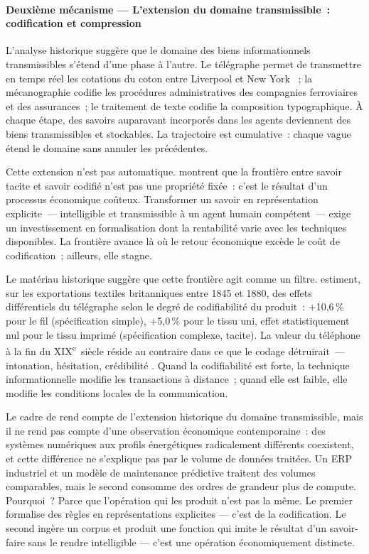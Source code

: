 \paragraph{Deuxième mécanisme --- L'extension du domaine transmissible~: codification et compression}

\markEVO
L'analyse historique suggère que le domaine des biens informationnels transmissibles s'étend d'une phase à l'autre. Le télégraphe permet de transmettre en temps réel les cotations du coton entre Liverpool et New York \parencite{steinwender_real_2018}~; la mécanographie codifie les procédures administratives des compagnies ferroviaires et des assurances~; le traitement de texte codifie la composition typographique. À chaque étape, des savoirs auparavant incorporés dans les agents deviennent des biens transmissibles et stockables. La trajectoire est cumulative~: chaque vague étend le domaine sans annuler les précédentes.

Cette extension n'est pas automatique. \textcite{cowan_explicit_2000} montrent que la frontière entre savoir tacite et savoir codifié n'est pas une propriété fixée~: c'est le résultat d'un processus économique coûteux. Transformer un savoir en représentation explicite~--- intelligible et transmissible à un agent humain compétent~--- exige un investissement en formalisation dont la rentabilité varie avec les techniques disponibles. La frontière avance là où le retour économique excède le coût de codification~; ailleurs, elle stagne.

Le matériau historique suggère que cette frontière agit comme un filtre. \textcite{juhasz_spinning_2018} estiment, sur les exportations textiles britanniques entre 1845 et 1880, des effets différentiels du télégraphe selon le degré de codifiabilité du produit~: $+$10,6\,\% pour le fil (spécification simple), $+$5,0\,\% pour le tissu uni, effet statistiquement nul pour le tissu imprimé (spécification complexe, tacite). La valeur du téléphone à la fin du XIX\textsuperscript{e}~siècle réside au contraire dans ce que le codage détruirait~--- intonation, hésitation, crédibilité \parencite{hounshell_inventors_1975}. Quand la codifiabilité est forte, la technique informationnelle modifie les transactions à distance~; quand elle est faible, elle modifie les conditions locales de la communication.

Le cadre de \textcite{cowan_explicit_2000} rend compte de l'extension historique du domaine transmissible, mais il ne rend pas compte d'une observation économique contemporaine~: des systèmes numériques aux profils énergétiques radicalement différents coexistent, et cette différence ne s'explique pas par le volume de données traitées. Un ERP industriel et un modèle de maintenance prédictive traitent des volumes comparables, mais le second consomme des ordres de grandeur plus de compute. Pourquoi~? Parce que l'opération qui les produit n'est pas la même. Le premier formalise des règles en représentations explicites --- c'est de la codification. Le second ingère un corpus et produit une fonction qui imite le résultat d'un savoir-faire sans le rendre intelligible --- c'est une opération économiquement distincte.

